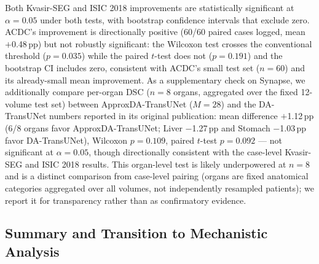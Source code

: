 Both Kvasir-SEG and ISIC 2018 improvements are statistically significant at $\alpha{=}0.05$ under both tests, with bootstrap confidence intervals that exclude zero. ACDC's improvement is directionally positive (60/60 paired cases logged, mean $+$0.48\,pp) but not robustly significant: the Wilcoxon test crosses the conventional threshold ($p{=}0.035$) while the paired $t$-test does not ($p{=}0.191$) and the bootstrap CI includes zero, consistent with ACDC's small test set ($n{=}60$) and its already-small mean improvement. As a supplementary check on Synapse, we additionally compare per-organ DSC ($n{=}8$ organs, aggregated over the fixed 12-volume test set) between ApproxDA-TransUNet ($M{=}28$) and the DA-TransUNet numbers reported in its original publication: mean difference $+$1.12\,pp (6/8 organs favor ApproxDA-TransUNet; Liver $-$1.27\,pp and Stomach $-$1.03\,pp favor DA-TransUNet), Wilcoxon $p{=}0.109$, paired $t$-test $p{=}0.092$ --- not significant at $\alpha{=}0.05$, though directionally consistent with the case-level Kvasir-SEG and ISIC 2018 results. This organ-level test is likely underpowered at $n{=}8$ and is a distinct comparison from case-level pairing (organs are fixed anatomical categories aggregated over all volumes, not independently resampled patients); we report it for transparency rather than as confirmatory evidence.

\subsection{Summary and Transition to Mechanistic Analysis}

